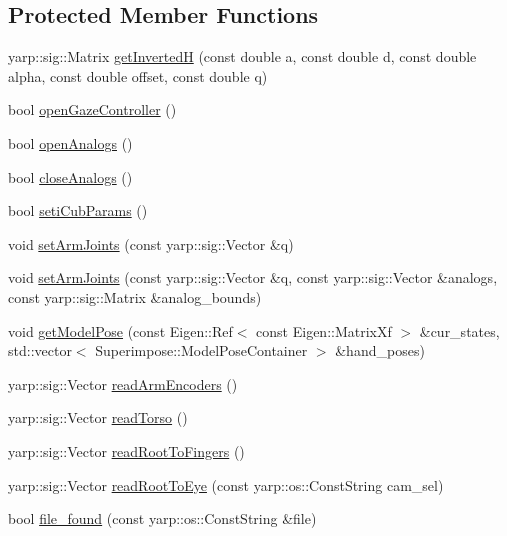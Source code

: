 \subsection*{Protected Member Functions}
\begin{DoxyCompactItemize}
\item 
yarp\+::sig\+::\+Matrix \hyperlink{classVisualProprioception_a30b0283a5c8b29bdf828c291e7868e51}{get\+InvertedH} (const double a, const double d, const double alpha, const double offset, const double q)
\item 
bool \hyperlink{classVisualProprioception_aaa7b46247c25b4e69a389b82472caadf}{open\+Gaze\+Controller} ()
\item 
bool \hyperlink{classVisualProprioception_aade0b47250e8315166b36f7b731d360d}{open\+Analogs} ()
\item 
bool \hyperlink{classVisualProprioception_a0d7954358702576e252efd76694d9a18}{close\+Analogs} ()
\item 
bool \hyperlink{classVisualProprioception_a23b9c75f9a3c44442a371676a0379a19}{seti\+Cub\+Params} ()
\item 
void \hyperlink{classVisualProprioception_afe0bc2a5d6fea18d75764ed12755f3ee}{set\+Arm\+Joints} (const yarp\+::sig\+::\+Vector \&q)
\item 
void \hyperlink{classVisualProprioception_ae701fa6d07822f151bfb2bce4384fb32}{set\+Arm\+Joints} (const yarp\+::sig\+::\+Vector \&q, const yarp\+::sig\+::\+Vector \&analogs, const yarp\+::sig\+::\+Matrix \&analog\+\_\+bounds)
\item 
void \hyperlink{classVisualProprioception_a06131e57aab757389277f6c06bbd6dc7}{get\+Model\+Pose} (const Eigen\+::\+Ref$<$ const Eigen\+::\+Matrix\+Xf $>$ \&cur\+\_\+states, std\+::vector$<$ Superimpose\+::\+Model\+Pose\+Container $>$ \&hand\+\_\+poses)
\item 
yarp\+::sig\+::\+Vector \hyperlink{classVisualProprioception_a9a1a2dd7b57fc600388244a3001b16ad}{read\+Arm\+Encoders} ()
\item 
yarp\+::sig\+::\+Vector \hyperlink{classVisualProprioception_a3bf5b9321ccf560bb3955cbe17fc5cab}{read\+Torso} ()
\item 
yarp\+::sig\+::\+Vector \hyperlink{classVisualProprioception_af3370849532d77174f5848f415c08e9e}{read\+Root\+To\+Fingers} ()
\item 
yarp\+::sig\+::\+Vector \hyperlink{classVisualProprioception_aa0ce08aa7f8fa882ade6997a1c9297ad}{read\+Root\+To\+Eye} (const yarp\+::os\+::\+Const\+String cam\+\_\+sel)
\item 
bool \hyperlink{classVisualProprioception_ab7be48b8a9dae0913d7554c3e30ad9e4}{file\+\_\+found} (const yarp\+::os\+::\+Const\+String \&file)
\end{DoxyCompactItemize}
